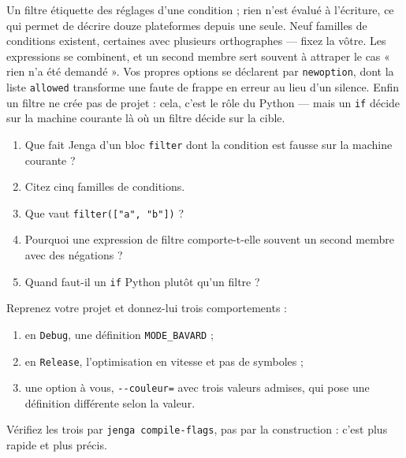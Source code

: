\begin{nkbilan}
Un filtre étiquette des réglages d'une condition ; rien n'est évalué à
l'écriture, ce qui permet de décrire douze plateformes depuis une seule. Neuf
familles de conditions existent, certaines avec plusieurs orthographes --- fixez
la vôtre. Les expressions se combinent, et un second membre sert souvent à
attraper le cas « rien n'a été demandé ». Vos propres options se déclarent par
\texttt{newoption}, dont la liste \texttt{allowed} transforme une faute de frappe
en erreur au lieu d'un silence. Enfin un filtre ne crée pas de projet : cela,
c'est le rôle du Python --- mais un \texttt{if} décide sur la machine courante là
où un filtre décide sur la cible.
\end{nkbilan}

\begin{nkquestions}
\begin{enumerate}
\item Que fait Jenga d'un bloc \texttt{filter} dont la condition est fausse sur
      la machine courante ?
\item Citez cinq familles de conditions.
\item Que vaut \texttt{filter(["a", "b"])} ?
\item Pourquoi une expression de filtre comporte-t-elle souvent un second membre
      avec des négations ?
\item Quand faut-il un \texttt{if} Python plutôt qu'un filtre ?
\end{enumerate}
\end{nkquestions}

\begin{nkpratique}
Reprenez votre projet et donnez-lui trois comportements :

\begin{enumerate}
\item en \texttt{Debug}, une définition \texttt{MODE\_BAVARD} ;
\item en \texttt{Release}, l'optimisation en vitesse et pas de symboles ;
\item une option à vous, \texttt{-{}-couleur=} avec trois valeurs admises, qui
      pose une définition différente selon la valeur.
\end{enumerate}

Vérifiez les trois par \texttt{jenga compile-flags}, pas par la construction :
c'est plus rapide et plus précis.
\end{nkpratique}

